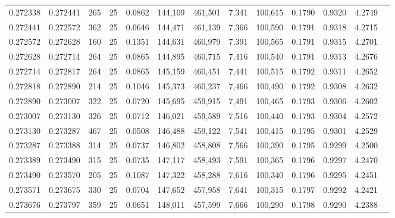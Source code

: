 \begin{tabular}{rrrrrrrrrrrrr}
0.272338 & 0.272441 &   265 &  25 &                                     0.0862 & 144,109 & 461,501 &   7,341 & 100,615 & 0.1790 & 0.9320 & 4.2749 \\
0.272441 & 0.272572 &   362 &  25 &                                     0.0646 & 144,471 & 461,139 &   7,366 & 100,590 & 0.1791 & 0.9318 & 4.2715 \\
0.272572 & 0.272628 &   160 &  25 &                                     0.1351 & 144,631 & 460,979 &   7,391 & 100,565 & 0.1791 & 0.9315 & 4.2701 \\
0.272628 & 0.272714 &   264 &  25 &                                     0.0865 & 144,895 & 460,715 &   7,416 & 100,540 & 0.1791 & 0.9313 & 4.2676 \\
0.272714 & 0.272817 &   264 &  25 &                                     0.0865 & 145,159 & 460,451 &   7,441 & 100,515 & 0.1792 & 0.9311 & 4.2652 \\
0.272818 & 0.272890 &   214 &  25 &                                     0.1046 & 145,373 & 460,237 &   7,466 & 100,490 & 0.1792 & 0.9308 & 4.2632 \\
0.272890 & 0.273007 &   322 &  25 &                                     0.0720 & 145,695 & 459,915 &   7,491 & 100,465 & 0.1793 & 0.9306 & 4.2602 \\
0.273007 & 0.273130 &   326 &  25 &                                     0.0712 & 146,021 & 459,589 &   7,516 & 100,440 & 0.1793 & 0.9304 & 4.2572 \\
0.273130 & 0.273287 &   467 &  25 &                                     0.0508 & 146,488 & 459,122 &   7,541 & 100,415 & 0.1795 & 0.9301 & 4.2529 \\
0.273287 & 0.273388 &   314 &  25 &                                     0.0737 & 146,802 & 458,808 &   7,566 & 100,390 & 0.1795 & 0.9299 & 4.2500 \\
0.273389 & 0.273490 &   315 &  25 &                                     0.0735 & 147,117 & 458,493 &   7,591 & 100,365 & 0.1796 & 0.9297 & 4.2470 \\
0.273490 & 0.273570 &   205 &  25 &                                     0.1087 & 147,322 & 458,288 &   7,616 & 100,340 & 0.1796 & 0.9295 & 4.2451 \\
0.273571 & 0.273675 &   330 &  25 &                                     0.0704 & 147,652 & 457,958 &   7,641 & 100,315 & 0.1797 & 0.9292 & 4.2421 \\
0.273676 & 0.273797 &   359 &  25 &                                     0.0651 & 148,011 & 457,599 &   7,666 & 100,290 & 0.1798 & 0.9290 & 4.2388 \\

\end{tabular}
